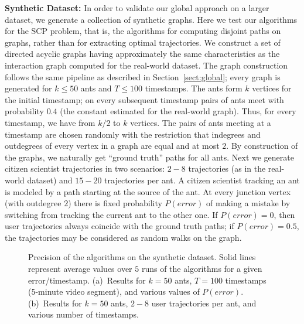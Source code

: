 \documentclass{llncs}
\newcommand{\SCoP}{\textsc{SCP}}
\begin{document}
{\bf Synthetic Dataset:}
In order to validate our global approach on a
larger dataset, we generate a collection of synthetic graphs. Here
we test our algorithms for the \SCoP{} problem, that is,
the algorithms for computing disjoint paths on graphs, rather than for extracting optimal trajectories.
We construct a set of directed acyclic graphs having approximately the same
characteristics as the interaction graph computed for the real-world dataset.
The graph construction follows the same pipeline as described in Section~\ref{sect:global};
every graph is generated for $k\le 50$ ants and $T\le 100$ timestamps.
The ants form $k$ vertices for the initial timestamp; on every subsequent timestamp
pairs of ants meet with probability $0.4$ (the constant estimated for the real-world graph). Thus,
for every timestamp, we have from $k/2$ to $k$ vertices. The pairs of ants meeting at a timestamp
are chosen randomly with the restriction that indegrees and outdegrees of every vertex
in a graph are equal and at most $2$. By construction of the graphs, we naturally get
``ground truth'' paths for all ants.
Next we generate citizen scientist trajectories in two scenarios: $2-8$ trajectories (as in the real-world dataset) and $15-20$ trajectories per ant. A citizen scientist tracking an ant is modeled by a path starting at the source of the ant. At every junction vertex (with outdegree $2$) there is fixed probability $P(error)$ of making a mistake by switching from tracking the current ant to the other one.
If $P(error)=0$, then user trajectories always coincide with the ground truth paths; if $P(error)=0.5$, the trajectories may be considered as random walks on the graph.

\begin{figure}[t]
    \center
\hfill
    \caption{Precision of the algorithms on the synthetic dataset. Solid lines represent average values
    over $5$ runs of the algorithms for a given error/timestamp.
    (a)~Results for $k=50$ ants, $T=100$ timestamps (5-minute video segment), and
    various values of $P(error)$.
    (b)~Results for $k=50$ ants, $2-8$ user trajectories per ant, and various number of timestamps.}
    \label{fig:growing_real}
\end{figure}
\end{document}
